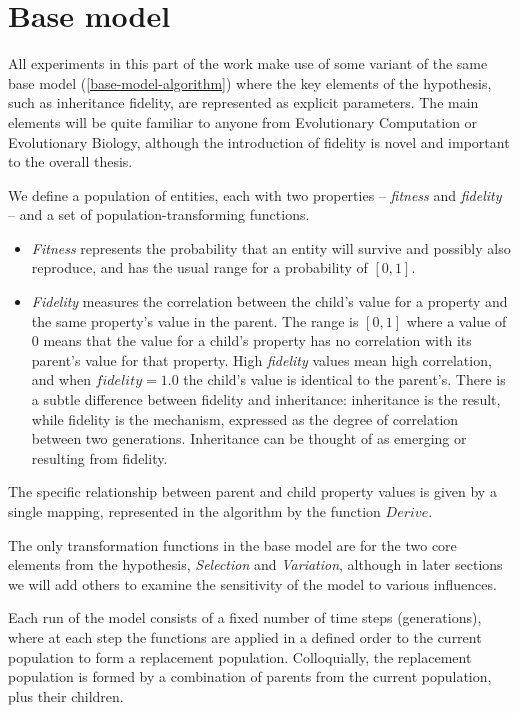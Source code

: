 \section{Base model}\label{base-model}

All experiments in this part of the work make use of some variant of the same base model (\autoref{base-model-algorithm}) where the key elements of the hypothesis, such as inheritance fidelity, are represented as explicit parameters. The main elements will be quite familiar to anyone from Evolutionary Computation or Evolutionary Biology, although the introduction of fidelity is novel and important to the overall thesis.

We define a population of entities, each with two properties -- \emph{fitness} and \emph{fidelity} -- and a set of population-transforming functions.

\begin{itemize}
	\item \emph{Fitness} represents the probability that an entity will survive and possibly also reproduce, and has the usual range for a probability of $[0,1]$.
	\item \emph{Fidelity} measures the correlation between the child's value for a property and the same property's value in the parent. The range is $[0,1]$ where a value of $0$ means that the value for a child's property has no correlation with its parent's value for that property. High \emph{fidelity} values mean high correlation, and when $fidelity = 1.0$ the child's value is identical to the parent's.  There is a subtle difference between fidelity and inheritance: inheritance is the result, while fidelity is the mechanism, expressed as the degree of correlation between two generations. Inheritance can be thought of as emerging or resulting from fidelity.
\end{itemize}

The specific relationship between parent and child property values is given by a single mapping, represented in the algorithm by the function $Derive$.

The only transformation functions in the base model are for the two core elements from the hypothesis, \emph{Selection} and \emph{Variation}, although in later sections we will add others to examine the sensitivity of the model to various influences.

Each \gls{run} of the model consists of a fixed number of time steps (generations), where at each step the functions are applied in a defined order to the current population to form a replacement population. Colloquially, the replacement population is formed by a combination of parents from the current population, plus their children.

